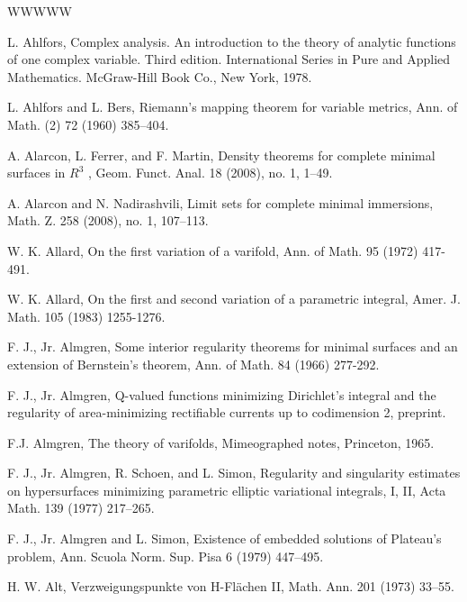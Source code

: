 
\begin{thebibliography}{WWWWW}

 L. Ahlfors, Complex analysis. An introduction to the theory of analytic functions of one complex variable. Third edition. International Series in Pure and Applied Mathematics. McGraw-Hill Book Co., New York, 1978.

 L. Ahlfors and L. Bers, Riemann's mapping theorem for variable metrics, Ann. of Math. (2) 72 (1960) 385–404.

 A. Alarcon, L. Ferrer, and F. Martin, Density theorems for complete minimal surfaces in $R^{3}$ , Geom. Funct. Anal. 18 (2008), no. 1, 1–49.

 A. Alarcon and N. Nadirashvili, Limit sets for complete minimal immersions, Math. Z. 258 (2008), no. 1, 107–113.

 W. K. Allard, On the first variation of a varifold, Ann. of Math. 95 (1972) 417-491.

 W. K. Allard, On the first and second variation of a parametric integral, Amer. J. Math. 105 (1983) 1255-1276.

 F. J., Jr. Almgren, Some interior regularity theorems for minimal surfaces and an extension of Bernstein's theorem, Ann. of Math. 84 (1966) 277-292.

 F. J., Jr. Almgren, Q-valued functions minimizing Dirichlet's integral and the regularity of area-minimizing rectifiable currents up to codimension 2, preprint.

 F.J. Almgren, The theory of varifolds, Mimeographed notes, Princeton, 1965.

 F. J., Jr. Almgren, R. Schoen, and L. Simon, Regularity and singularity estimates on hypersurfaces minimizing parametric elliptic variational integrals, I, II, Acta Math. 139 (1977) 217–265.

 F. J., Jr. Almgren and L. Simon, Existence of embedded solutions of Plateau's problem, Ann. Scuola Norm. Sup. Pisa 6 (1979) 447–495.

 H. W. Alt, Verzweigungspunkte von H-Flächen II, Math. Ann. 201 (1973) 33–55.


\end{thebibliography}
